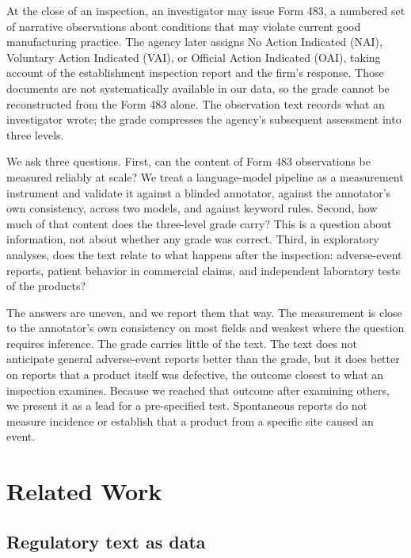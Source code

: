 \documentclass[12pt]{article}
\begin{document}
At the close of an inspection, an investigator may issue Form 483, a numbered
set of narrative observations about conditions that may violate current good
manufacturing practice. The agency later assigns No Action Indicated (NAI),
Voluntary Action Indicated (VAI), or Official Action Indicated (OAI), taking
account of the establishment inspection report and the firm's response.
Those documents are not systematically available in our data, so the grade
cannot be reconstructed from the Form 483 alone. The observation text
records what an investigator wrote; the grade compresses the agency's
subsequent assessment into three levels.

We ask three questions. First, can the content of Form 483 observations be
measured reliably at scale? We treat a language-model pipeline as a
measurement instrument and validate it against a blinded annotator, against
the annotator's own consistency, across two models, and against keyword
rules. Second, how much of that content does the three-level grade carry?
This is a question about information, not about whether any grade was
correct. Third, in exploratory analyses, does the text relate to what
happens after the inspection: adverse-event reports, patient behavior in
commercial claims, and independent laboratory tests of the products?

The answers are uneven, and we report them that way. The measurement is
close to the annotator's own consistency on most fields and weakest where
the question requires inference. The grade carries little of the text. The
text does not anticipate general adverse-event reports better than the
grade, but it does better on reports that a product itself was defective,
the outcome closest to what an inspection examines. Because we reached that
outcome after examining others, we present it as a lead for a pre-specified
test. Spontaneous reports do not measure incidence or establish that a
product from a specific site caused an event.

\section{Related Work}
\label{sec:lit}

\subsection{Regulatory text as data}
\end{document}
